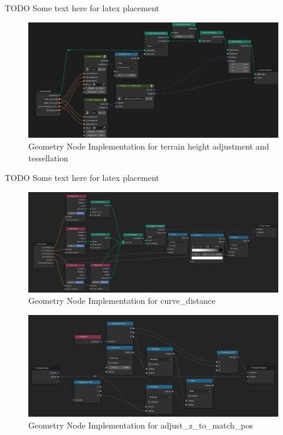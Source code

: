 TODO Some text here for latex placement

\begin{figure}[H]
    \centering
    \includegraphics[width=14.5cm]{src/img/pic/pic-2 screenshot of blender adjust terrain geometry node.png}
    \caption{Geometry Node Implementation for terrain height adjustment and tessellation}
    \label{fig:impl-geom-nodes-terrain}
\end{figure}


TODO Some text here for latex placement


\begin{figure}[H]
    \centering
    \includegraphics[width=14.5cm]{src/img/pic/pic-3 blender geometry screenshot curve_distance.png}
    \caption{Geometry Node Implementation for curve_distance}
    \label{fig:impl-curve-dist}
\end{figure}

\begin{figure}[H]
    \centering
    \includegraphics[width=14.5cm]{src/img/pic/pic-4 blender geometry node screenshot adjust_z_to_match_pos.png}
    \caption{Geometry Node Implementation for adjust_z_to_match_pos}
    \label{fig:impl-adjust-z-to-match-pos}
\end{figure}


